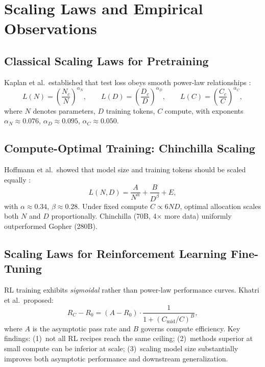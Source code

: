 \documentclass[12pt,a4paper]{report}
\theoremstyle{definition}
\begin{document}
\section{Scaling Laws and Empirical Observations}
\label{sec:scaling-laws}

\subsection{Classical Scaling Laws for Pretraining}

Kaplan et al.\ established that test loss obeys smooth power-law relationships \cite{kaplan2020scaling}:
\begin{equation}
  L(N) = \left(\frac{N_c}{N}\right)^{\!\alpha_N}\!,\qquad
  L(D) = \left(\frac{D_c}{D}\right)^{\!\alpha_D}\!,\qquad
  L(C) = \left(\frac{C_c}{C}\right)^{\!\alpha_C}\!,
  \label{eq:kaplan-power-laws}
\end{equation}
where $N$ denotes parameters, $D$ training tokens, $C$ compute, with exponents $\alpha_N \approx 0.076$, $\alpha_D \approx 0.095$, $\alpha_C \approx 0.050$.

\subsection{Compute-Optimal Training: Chinchilla Scaling}

Hoffmann et al.\ showed that model size and training tokens should be scaled equally \cite{hoffmann2022chinchilla}:
\begin{equation}
  L(N, D) = \frac{A}{N^{\alpha}} + \frac{B}{D^{\beta}} + E,
  \label{eq:chinchilla}
\end{equation}
with $\alpha \approx 0.34$, $\beta \approx 0.28$. Under fixed compute $C \propto 6ND$, optimal allocation scales both $N$ and $D$ proportionally. Chinchilla (70B, 4$\times$ more data) uniformly outperformed Gopher (280B).

\subsection{Scaling Laws for Reinforcement Learning Fine-Tuning}

RL training exhibits \emph{sigmoidal} rather than power-law performance curves. Khatri et al.\ proposed:
\begin{equation}
  R_C - R_0 = (A - R_0) \cdot \frac{1}{1 + (C_{\text{mid}} / C)^B},
  \label{eq:rl-sigmoid}
\end{equation}
where $A$ is the asymptotic pass rate and $B$ governs compute efficiency. Key findings: (1)~not all RL recipes reach the same ceiling; (2)~methods superior at small compute can be inferior at scale; (3)~scaling model size substantially improves both asymptotic performance and downstream generalization.
\end{document}
